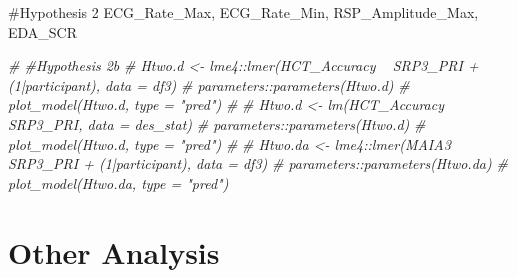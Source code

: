 \documentclass[
]{article}
\newenvironment{Shaded}{\begin{snugshade}}{\end{snugshade}}
\newcommand{\CommentTok}[1]{\textcolor[rgb]{0.56,0.35,0.01}{\textit{#1}}}
\begin{document}
\#Hypothesis 2 ECG\_Rate\_Max, ECG\_Rate\_Min, RSP\_Amplitude\_Max,
EDA\_SCR

\begin{Shaded}
\begin{Highlighting}[]
\CommentTok{# #Hypothesis 2b  }
\CommentTok{# Htwo.d <- lme4::lmer(HCT_Accuracy ~  SRP3_PRI + (1|participant), data = df3)}
\CommentTok{# parameters::parameters(Htwo.d)}
\CommentTok{# plot_model(Htwo.d, type = "pred")}
\CommentTok{# }
\CommentTok{# Htwo.d <- lm(HCT_Accuracy ~  SRP3_PRI, data = des_stat)}
\CommentTok{# parameters::parameters(Htwo.d)}
\CommentTok{# plot_model(Htwo.d, type = "pred")}
\CommentTok{# }
\CommentTok{# Htwo.da <- lme4::lmer(MAIA3 ~  SRP3_PRI + (1|participant), data = df3)}
\CommentTok{# parameters::parameters(Htwo.da)}
\CommentTok{# plot_model(Htwo.da, type = "pred")}
\end{Highlighting}
\end{Shaded}

\hypertarget{other-analysis}{%
\section{Other Analysis}\label{other-analysis}}
\end{document}
